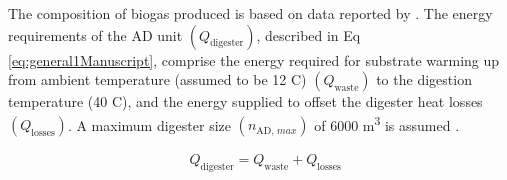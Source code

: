 \begin{refsection}[referencesCh6]
The composition of biogas produced is based on data reported by \citet{Ciborowski}. The energy requirements of the AD unit $\left( Q_{\text{digester}} \right)$, described in Eq  \ref{eq:general1Manuscript}, comprise the energy required for substrate warming up from ambient temperature (assumed to be 12 \textdegree C) $\left( Q_{\text{waste}} \right)$ to the digestion temperature (40 \textdegree C),
and the energy supplied to offset the digester heat losses $\left( Q_{\text{losses}} \right)$.
{} A maximum digester size $\left( n_{\text{AD, }max} \right)$ of 6000 m\textsuperscript{3} is assumed \citep{ADSize}.

\begin{align}
	& Q_{\text{digester}} = Q_{\text{waste}} + Q_{\text{losses}} \label{eq:general1Manuscript}
\end{align}


\end{refsection}
